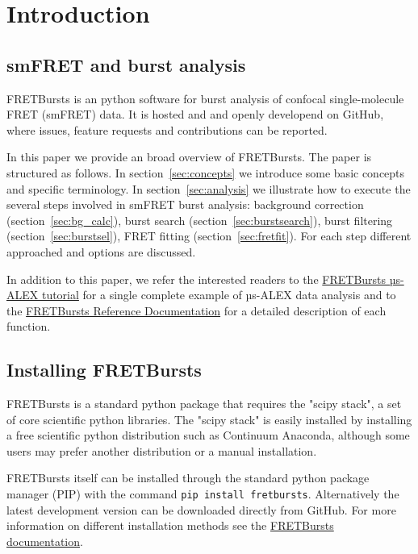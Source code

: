 \section{Introduction}

\subsection{smFRET and burst analysis}

FRETBursts is an python software for burst analysis of confocal single-molecule
FRET (smFRET) data. It is hosted and and openly developend on GitHub, where
issues, feature requests and contributions can be reported.

In this paper we provide an broad overview of FRETBursts. The 
paper is structured as follows. In section~\ref{sec:concepts} we
introduce some basic concepts and specific terminology.
In section~\ref{sec:analysis} we illustrate how to execute the several steps involved
in smFRET burst analysis: background correction (section~\ref{sec:bg_calc}), burst search
(section~\ref{sec:burstsearch}), burst filtering (section~\ref{sec:burstsel}), 
FRET fitting (section~\ref{sec:fretfit}). For each step different approached and options 
are discussed.

In addition to this paper, we refer the interested readers to the 
\href{http://nbviewer.ipython.org/github/tritemio/FRETBursts_notebooks/blob/master/notebooks/FRETBursts\%20-\%20us-ALEX\%20smFRET\%20burst\%20analysis.ipynb}{FRETBursts µs-ALEX tutorial} 
for a single complete example of µs-ALEX data analysis and to the
\href{http://fretbursts.readthedocs.org/}{FRETBursts Reference Documentation}
for a detailed description of each function.

\subsection{Installing FRETBursts}
FRETBursts is a standard python package that requires the "scipy stack", a set
of core scientific python libraries.
The "scipy stack" is easily installed by installing a free scientific python
distribution such as Continuum Anaconda, although some users may prefer another
distribution or a manual installation.

FRETBursts itself can be installed through the standard python package manager (PIP)
with the command \texttt{pip install fretbursts}. 
Alternatively the latest development version can be downloaded directly 
from GitHub. For more information on different installation methods see the
\href{http://fretbursts.readthedocs.org/en/latest/installation.html}{FRETBursts
documentation}.

